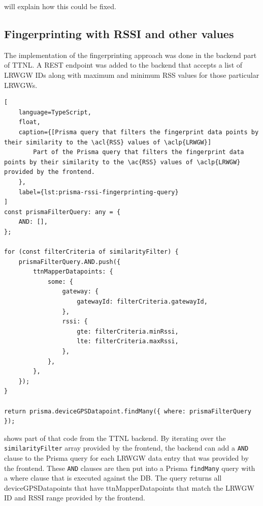  will explain how this could be fixed.

\subsection{Fingerprinting with \acl{RSSI} and other values}\label{sec:fingerprinting-implementation}

The implementation of the fingerprinting approach was done in the backend part of \ac{TTNL}.
A \ac{REST} endpoint was added to the backend that accepts a list of \acl{LRWGW} IDs along with maximum and minimum \ac{RSS} values for those particular \aclp{LRWGW}.

\begin{lstlisting}[
    language=TypeScript,
    float,
    caption={[Prisma query that filters the fingerprint data points by their similarity to the \acl{RSS} values of \aclp{LRWGW}]
        Part of the Prisma query that filters the fingerprint data points by their similarity to the \ac{RSS} values of \aclp{LRWGW} provided by the frontend.
    },
    label={lst:prisma-rssi-fingerprinting-query}
]
const prismaFilterQuery: any = {
    AND: [],
};

for (const filterCriteria of similarityFilter) {
    prismaFilterQuery.AND.push({
        ttnMapperDatapoints: {
            some: {
                gateway: {
                    gatewayId: filterCriteria.gatewayId,
                },
                rssi: {
                    gte: filterCriteria.minRssi,
                    lte: filterCriteria.maxRssi,
                },
            },
        },
    });
}

return prisma.deviceGPSDatapoint.findMany({ where: prismaFilterQuery });
\end{lstlisting}

 shows part of that code from the \ac{TTNL} backend.
By iterating over the \lstinline|similarityFilter| array provided by the frontend, the backend can add a \lstinline|AND| clause to the Prisma query for each \acl{LRWGW} data entry that was provided by the frontend.
These \lstinline|AND| clauses are then put into a Prisma \lstinline|findMany| query with a where clause that is executed against the \ac{DB}.
The query returns all deviceGPSDatapoints that have ttnMapperDatapoints that match the \acl{LRWGW} ID and \ac{RSSI} range provided by the frontend.

